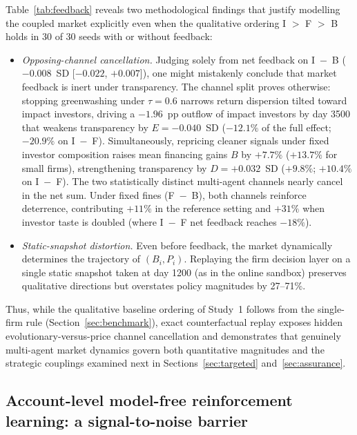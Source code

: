 \documentclass[11pt]{article}
\begin{document}
Table~\ref{tab:feedback} reveals two methodological findings that justify modelling the coupled market explicitly even when the qualitative ordering I $>$ F $>$ B holds in 30 of 30 seeds with or without feedback:
\begin{itemize}[leftmargin=*]
\item \emph{Opposing-channel cancellation.} Judging solely from net feedback on I~$-$~B ($-0.008$~SD [$-0.022$, $+0.007$]), one might mistakenly conclude that market feedback is inert under transparency. The channel split proves otherwise: stopping greenwashing under $\tau = 0.6$ narrows return dispersion tilted toward impact investors, driving a $-1.96$~pp outflow of impact investors by day 3500 that weakens transparency by $E = -0.040$~SD ($-12.1\%$ of the full effect; $-20.9\%$ on I~$-$~F). Simultaneously, repricing cleaner signals under fixed investor composition raises mean financing gains $B$ by $+7.7\%$ ($+13.7\%$ for small firms), strengthening transparency by $D = +0.032$~SD ($+9.8\%$; $+10.4\%$ on I~$-$~F). The two statistically distinct multi-agent channels nearly cancel in the net sum. Under fixed fines (F~$-$~B), both channels reinforce deterrence, contributing $+11\%$ in the reference setting and $+31\%$ when investor taste is doubled (where I~$-$~F net feedback reaches $-18\%$).
\item \emph{Static-snapshot distortion.} Even before feedback, the market dynamically determines the trajectory of $(B_i, P_i)$. Replaying the firm decision layer on a single static snapshot taken at day 1200 (as in the online sandbox) preserves qualitative directions but overstates policy magnitudes by 27--71\%.
\end{itemize}
Thus, while the qualitative baseline ordering of Study~1 follows from the single-firm rule (Section~\ref{sec:benchmark}), exact counterfactual replay exposes hidden evolutionary-versus-price channel cancellation and demonstrates that genuinely multi-agent market dynamics govern both quantitative magnitudes and the strategic couplings examined next in Sections~\ref{sec:targeted} and~\ref{sec:assurance}.

\subsection{Account-level model-free reinforcement learning: a signal-to-noise barrier}\label{sec:learning}
\end{document}
